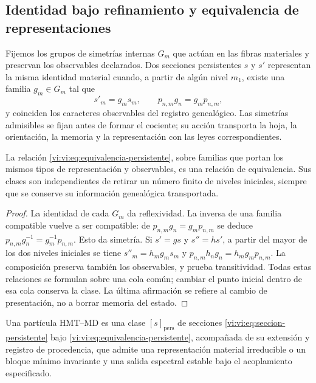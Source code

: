 \subsection{Identidad bajo refinamiento y equivalencia de representaciones}
\label{vi:vi:subsec:identidad-material}

Fijemos los grupos de simetrías internas $G_m$ que actúan en las fibras
materiales y preservan los observables declarados. Dos secciones
persistentes $s$ y $s'$ representan la misma identidad material cuando,
a partir de algún nivel $m_1$, existe una familia $g_m\in G_m$ tal que
\begin{equation}
 s'_m=g_ms_m,\qquad
 p_{n,m}g_n=g_mp_{n,m},
 \label{vi:vi:eq:equivalencia-persistente}
\end{equation}
y coinciden los caracteres observables del registro genealógico. Las
simetrías admisibles se fijan antes de formar el cociente; su acción
transporta la hoja, la orientación, la memoria y la representación con
las leyes correspondientes.

\begin{proposition}
\label{vi:vi:prop:equivalencia-persistente}
La relación \eqref{vi:vi:eq:equivalencia-persistente}, sobre familias que
portan los mismos tipos de representación y observables, es una relación
de equivalencia. Sus clases son independientes de retirar un número
finito de niveles iniciales, siempre que se conserve su información
genealógica transportada.
\end{proposition}
\begin{proof}
La identidad de cada $G_m$ da reflexividad. La inversa de una familia
compatible vuelve a ser compatible: de
$p_{n,m}g_n=g_mp_{n,m}$ se deduce
$p_{n,m}g_n^{-1}=g_m^{-1}p_{n,m}$. Esto da simetría.
Si $s'=gs$ y $s''=hs'$, a partir del mayor de los dos niveles iniciales
se tiene $s''_m=h_mg_ms_m$ y
$p_{n,m}h_ng_n=h_mg_mp_{n,m}$. La composición preserva también los
observables, y prueba transitividad. Todas estas relaciones se formulan
sobre una cola común; cambiar el punto inicial dentro de esa cola
conserva la clase. La última afirmación se refiere al cambio de
presentación, no a borrar memoria del estado.
\end{proof}

\begin{definition}
\label{vi:vi:def:particula}
Una partícula HMT--MD es una clase $[s]_{\mathrm{pers}}$ de secciones
\eqref{vi:vi:eq:seccion-persistente} bajo
\eqref{vi:vi:eq:equivalencia-persistente}, acompañada de su extensión y
registro de procedencia, que admite una representación material
irreducible o un bloque mínimo invariante y una salida espectral estable
bajo el acoplamiento especificado.
\end{definition}

